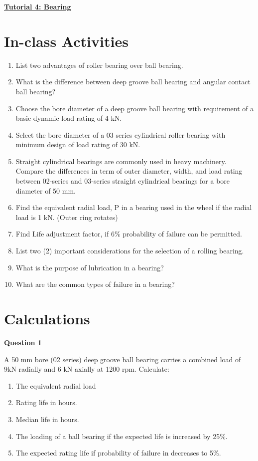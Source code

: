 \documentclass[a4paper, fleqn]{article}
\begin{document}
\underline{\textbf{Tutorial 4: Bearing}}
\vspace{10pt}

\section*{In-class Activities}
\begin{enumerate}
    \item List two advantages of roller bearing over ball bearing.
    \item What is the difference between deep groove ball bearing and angular contact ball bearing?
    \item Choose the bore diameter of a deep groove ball bearing with requirement of a basic dynamic load rating of 4 kN. 
    \item Select the bore diameter of a 03 series cylindrical roller bearing with minimum design of load rating of 30 kN. 
    \item Straight cylindrical bearings are commonly used in heavy machinery. Compare the differences in term of outer diameter, width, and load rating between 02-series and 03-series straight cylindrical bearings for a bore diameter of 50 mm. 
    \item Find the equivalent radial load, P in a bearing used in the wheel if the radial load is 1 kN. (Outer ring rotates)
    \item Find Life adjustment factor, if 6\% probability of failure can be permitted.
    \item List two (2) important considerations for the selection of a rolling bearing.
    \item What is the purpose of lubrication in a bearing?
    \item What are the common types of failure in a bearing?
\end{enumerate}

\section*{Calculations}
\textbf{Question 1}

A 50 mm bore (02 series) deep groove ball bearing carries a combined load of 9kN radially and 6 kN axially at 1200 rpm. Calculate:

\begin{enumerate}[label=(\roman*)]
    \item The equivalent radial load
    \item Rating life in hours.
    \item Median life in hours.
    \item The loading of a ball bearing if the expected life is increased by 25\%.
    \item The expected rating life if probability of failure in decreases to 5\%.
\end{enumerate}
\end{document}
